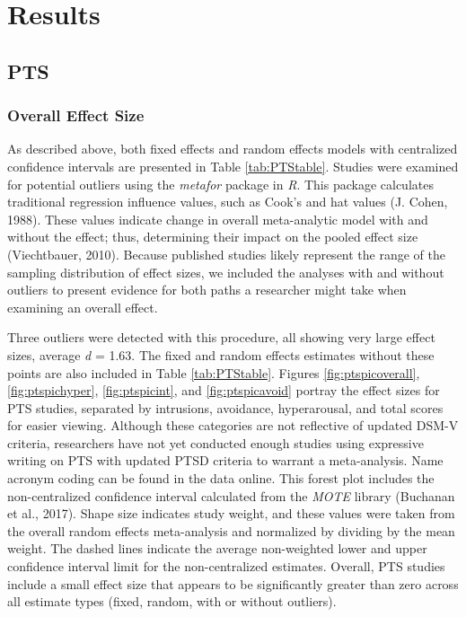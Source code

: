 \documentclass[english,man]{apa6}
\theoremstyle{definition}
\theoremstyle{definition}
\theoremstyle{definition}
\theoremstyle{remark}
\begin{document}
\section{Results}\label{results}

\subsection{PTS}\label{pts}

\subsubsection{Overall Effect Size}\label{overall-effect-size}

As described above, both fixed effects and random effects models with
centralized confidence intervals are presented in Table
\ref{tab:PTStable}. Studies were examined for potential outliers using
the \emph{metafor} package in \emph{R}. This package calculates
traditional regression influence values, such as Cook's and hat values
(J. Cohen, 1988). These values indicate change in overall meta-analytic
model with and without the effect; thus, determining their impact on the
pooled effect size (Viechtbauer, 2010). Because published studies likely
represent the range of the sampling distribution of effect sizes, we
included the analyses with and without outliers to present evidence for
both paths a researcher might take when examining an overall effect.

Three outliers were detected with this procedure, all showing very large
effect sizes, average \emph{d} = 1.63. The fixed and random effects
estimates without these points are also included in Table
\ref{tab:PTStable}. Figures \ref{fig:ptspicoverall},
\ref{fig:ptspichyper}, \ref{fig:ptspicint}, and \ref{fig:ptspicavoid}
portray the effect sizes for PTS studies, separated by intrusions,
avoidance, hyperarousal, and total scores for easier viewing. Although
these categories are not reflective of updated DSM-V criteria,
researchers have not yet conducted enough studies using expressive
writing on PTS with updated PTSD criteria to warrant a meta-analysis.
Name acronym coding can be found in the data online. This forest plot
includes the non-centralized confidence interval calculated from the
\emph{MOTE} library (Buchanan et al., 2017). Shape size indicates study
weight, and these values were taken from the overall random effects
meta-analysis and normalized by dividing by the mean weight. The dashed
lines indicate the average non-weighted lower and upper confidence
interval limit for the non-centralized estimates. Overall, PTS studies
include a small effect size that appears to be significantly greater
than zero across all estimate types (fixed, random, with or without
outliers).
\end{document}
